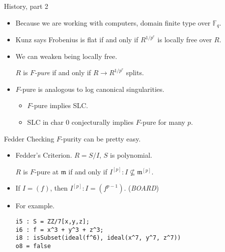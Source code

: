 \documentclass[xcolor=dvipsnames]{beamer}
\newcommand{\memph}[1]{{\color{Red}\emph{#1}}}
\newcommand{\bF}{\mathbb{F}}
\theoremstyle{remark}
\begin{document}
\begin{frame}[c]{History, part 2}
\begin{itemize}
\item<1->  Because we are working with computers, domain finite type over $\bF_q$.
\item<2->  Kunz says Frobenius is flat if and only if $R^{1/p^e}$ is locally free over $R$.
\item<3->  We can weaken being locally free.
\begin{definition}
  $R$ is \memph{$F$-pure} if and only if $R \to R^{1/p^e}$ splits.
\end{definition}
\item<4->  $F$-pure is analogous to log canonical singularities.
\begin{itemize}
  \item<5->  $F$-pure implies SLC.
  \item<6->  SLC in char 0 conjecturally implies $F$-pure for many $p$.
\end{itemize}
\end{itemize}
\end{frame}

\begin{frame}[fragile]{Fedder}
  Checking $F$-purity can be pretty easy.
  \begin{itemize}
    \item<2->  Fedder's Criterion.  $R = S/I$, $S$ is polynomial.
    \begin{theorem}[Fedder]
      $R$ is $F$-pure at $\mathfrak{m}$ if and only if $I^{[p]} : I \not\subseteq \mathfrak{m}^{[p]}$.
    \end{theorem}
   \item<3->  If $I = (f)$, then  $I^{[p]} : I = (f^{p-1})$.  (\memph{BOARD})
   \item<4->  For example.
   {}
   \begin{verbatim}
i5 : S = ZZ/7[x,y,z];
i6 : f = x^3 + y^3 + z^3;
i8 : isSubset(ideal(f^6), ideal(x^7, y^7, z^7))
o8 = false
   \end{verbatim}
  \end{itemize}
\end{frame}
\end{document}
